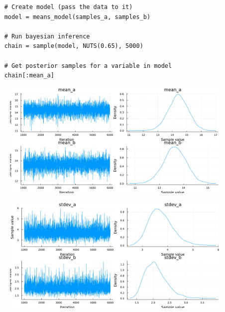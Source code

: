 \documentclass[aspectratio=169,xcolor=svgnames]{beamer}
\begin{document}
\begin{frame}[fragile]
  \begin{verbatim}
    # Create model (pass the data to it)
    model = means_model(samples_a, samples_b)

    # Run bayesian inference
    chain = sample(model, NUTS(0.65), 5000)

    # Get posterior samples for a variable in model
    chain[:mean_a]
  \end{verbatim}
\end{frame}

\begin{frame}
  \begin{figure}[ht]
    \centering
    \includegraphics[height=0.7\textheight]{figures/chain_mean.pdf}
  \end{figure}
\end{frame}

\begin{frame}
  \begin{figure}[ht]
    \centering
    \includegraphics[height=0.7\textheight]{figures/chain_stdev.pdf}
  \end{figure}
\end{frame}
\end{document}
